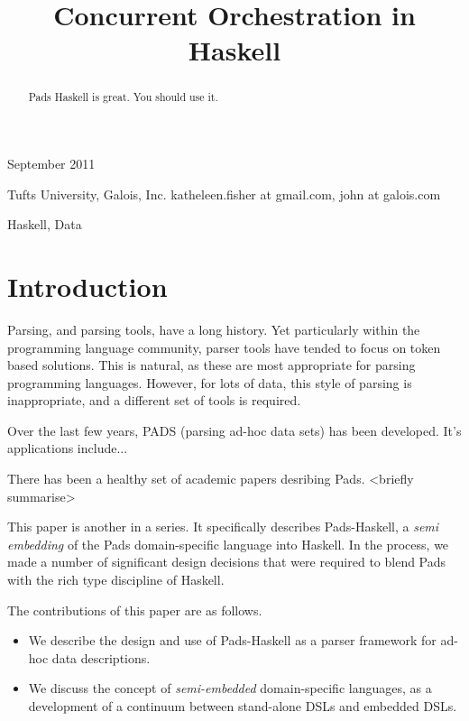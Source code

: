 \documentclass[preprint]{sigplanconf}
\begin{document}
 {September 2011}




\title{Concurrent Orchestration in Haskell}

           {Tufts University, Galois, Inc.}
           {katheleen.fisher at gmail.com, john at galois.com}

\maketitle

\begin{abstract}
Pads Haskell is great. You should use it.
\end{abstract}


\keywords Haskell, Data

\section{Introduction}
Parsing, and parsing tools, have a long history. Yet particularly within the programming language community, parser tools have tended to focus on token based solutions. This is natural, as these are most appropriate for parsing programming languages. However, for lots of data, this style of parsing is inappropriate, and a different set of tools is required.

Over the last few years, PADS (parsing ad-hoc data sets) has been developed. It's applications include...

There has been a healthy set of academic papers desribing Pads. <briefly summarise>

This paper is another in a series. It specifically describes Pads-Haskell, a {\it semi embedding} of the Pads domain-specific language into Haskell. In the process, we made a number of significant design decisions that were required to blend Pads with the rich type discipline of Haskell.

The contributions of this paper are as follows.
\begin{itemize}
\item  We describe the design and use of Pads-Haskell as a parser framework for ad-hoc data descriptions.
\item  We discuss the concept of {\it semi-embedded} domain-specific languages, as a development of a continuum between stand-alone DSLs and embedded DSLs.
\end{itemize}
\end{document}
